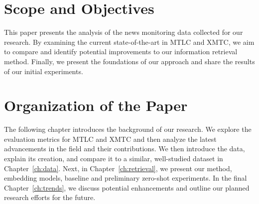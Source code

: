 \section{Scope and Objectives}
This paper presents the analysis of the news monitoring data collected for our research. 
By examining the current state-of-the-art in MTLC and XMTC, we aim to compare and identify potential improvements to our information retrieval method. 
Finally, we present the foundations of our approach and share the results of our initial experiments.

\section{Organization of the Paper}


The following chapter introduces the background of our research. 
We explore the evaluation metrics for MTLC and XMTC and then analyze the latest advancements in the field and their contributions.
We then introduce the data, explain its creation, and compare it to a similar, well-studied dataset in Chapter~\ref{ch:data}.
Next, in Chapter~\ref{ch:retrieval}, we present our method, embedding models, baseline and preliminary zero-shot experiments.
In the final Chapter~\ref{ch:trends}, we discuss potential enhancements and outline our planned research efforts for the future.
